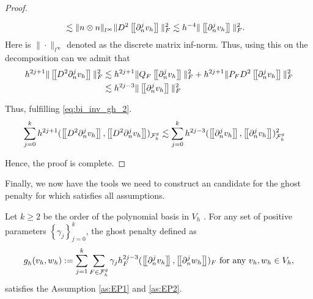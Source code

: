 \begin{proof}
\begin{enumerate}[label=\arabic*)]
\[\begin{split}
        & \lesssim  \| n \otimes n \|_{l^{\infty} }^{  }  \|  D^2 \left[\!\left[  \partial _{n}^{j} v_{h}  \right]\!\right]   \|_{ F  }^{ 2} \lesssim h^{-4} \|  \left[\!\left[  \partial ^{j}_{n} v_{h}  \right]\!\right]   \|_{ F }^{  2}.
            \end{split}
        \]
        Here is $\| \cdot  \|_{l^{\infty}  }^{  } $ denoted as the discrete matrix inf-norm.
        Thus, using this on the decomposition can we admit that
         \[
             \begin{split}
            h^{2j +1} \| \jump{D^2 \partial ^{j}_{n}  v_{h}}  \|_{ F }^{2  } & \lesssim h^{2j +1} \| Q_{F} \jump{ \partial ^{j}_{n}  v_{h} }  \|_{ F }^{2  } + h^{2j +1} \| P_{F} D^2 \jump{ \partial ^{j}_{n}  v_{h} }       \|_{ F }^{2  } \\
            &  \lesssim   h^{2j -3}  \| \jump{ \partial ^{j}_{n}v_{h} }   \|_{ F }^{ 2 }
             \end{split}
        \]

        Thus, fulfilling \eqref{eq:bi_inv_gh_2}.
        \[
            \begin{split}
         \sum_{j=0}^{k} h^{2j+1} ( \jump{   D^2 \partial ^{j}_{n}  v_{h} }, \jump{  D^2 \partial ^{j}_{n}  v_{h}}    )_{\mathcal{F}_{h}^{g}} & \lesssim  \sum_{j=0}^{k} h^{2j-3}  (\jump{    \partial ^{j}_{n}  v_{h} }, \jump{ \partial ^{j}_{n}  v_{h} }  )_{\mathcal{F} _{h}^{g}  }^{2  }
            \end{split}
        \]

    \end{enumerate}
    Hence, the proof is complete.

\end{proof}


Finally, we now have the tools we need to construct an candidate for the ghost penalty for which satisfies all assumptions.

\begin{proposition}
    Let $k\ge  2$ be the order of the polynomial basis in $V_{h}$ .
    For any set of positive parameters $\left\{ \gamma _{j} \right\} _{j=0}^{k}$, the ghost penalty defined as
    \begin{equation}
        \label{eq:ghost_penalty}
    g^{}_{h}( v_{h},w_{h})  := \sum_{j=1}^{k} \sum_{F \in \mathcal{F} _{h}^{g}}^{} \gamma _{j} h^{2j-3}_{F} ( \left[\!\left[  \partial ^{j}_{n} v_{h}  \right]\!\right], \left[\!\left[  \partial ^{j}_{n} w_{h}  \right]\!\right]  ) _{F} \text{ for any } v_{h},w_{h} \in V_{h},
    \end{equation}
    satisfies the Assumption \ref{as:EP1} and \ref{as:EP2}.
\end{proposition}

